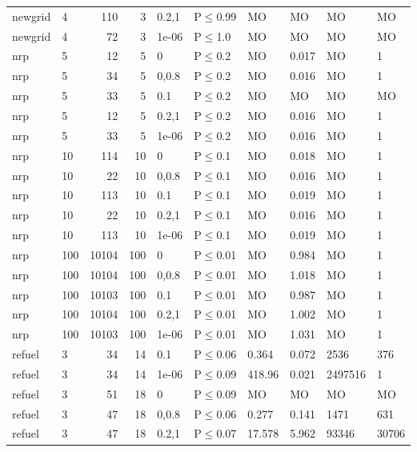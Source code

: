 \begin{longtable}{llrrllllll}
 newgrid       & 4         &    	110 &   3 & 0.2,1 & P$\leq$0.99  & MO       & MO       & MO      & MO     \\
 newgrid       & 4         &     	72 &   3 & 1e-06 & P$\leq$1.0   & MO       & MO       & MO      & MO     \\
 nrp           & 5         &     	12 &   5 & 0     & P$\leq$0.2   & MO       & 0.017    & MO      & 1      \\
 nrp           & 5         &     	34 &   5 & 0,0.8 & P$\leq$0.2   & MO       & 0.016    & MO      & 1      \\
 nrp           & 5         &     	33 &   5 & 0.1   & P$\leq$0.2   & MO       & MO       & MO      & MO     \\
 nrp           & 5         &     	12 &   5 & 0.2,1 & P$\leq$0.2   & MO       & 0.016    & MO      & 1      \\
 nrp           & 5         &     	33 &   5 & 1e-06 & P$\leq$0.2   & MO       & 0.016    & MO      & 1      \\
 nrp           & 10        &    	114 &  10 & 0     & P$\leq$0.1   & MO       & 0.018    & MO      & 1      \\
 nrp           & 10        &     	22 &  10 & 0,0.8 & P$\leq$0.1   & MO       & 0.016    & MO      & 1      \\
 nrp           & 10        &    	113 &  10 & 0.1   & P$\leq$0.1   & MO       & 0.019    & MO      & 1      \\
 nrp           & 10        &     	22 &  10 & 0.2,1 & P$\leq$0.1   & MO       & 0.016    & MO      & 1      \\
 nrp           & 10        &    	113 &  10 & 1e-06 & P$\leq$0.1   & MO       & 0.019    & MO      & 1      \\
 nrp           & 100       &  	10104 & 100 & 0     & P$\leq$0.01  & MO       & 0.984    & MO      & 1      \\
 nrp           & 100       &  	10104 & 100 & 0,0.8 & P$\leq$0.01  & MO       & 1.018    & MO      & 1      \\
 nrp           & 100       &  	10103 & 100 & 0.1   & P$\leq$0.01  & MO       & 0.987    & MO      & 1      \\
 nrp           & 100       &  	10104 & 100 & 0.2,1 & P$\leq$0.01  & MO       & 1.002    & MO      & 1      \\
 nrp           & 100       &  	10103 & 100 & 1e-06 & P$\leq$0.01  & MO       & 1.031    & MO      & 1      \\
 refuel        & 3         &     	34 &  14 & 0.1   & P$\leq$0.06  & 0.364    & 0.072    & 2536    & 376    \\
 refuel        & 3         &     	34 &  14 & 1e-06 & P$\leq$0.09  & 418.96   & 0.021    & 2497516 & 1      \\
 refuel        & 3         &     	51 &  18 & 0     & P$\leq$0.09  & MO       & MO       & MO      & MO     \\
 refuel        & 3         &     	47 &  18 & 0,0.8 & P$\leq$0.06  & 0.277    & 0.141    & 1471    & 631    \\
 refuel        & 3         &     	47 &  18 & 0.2,1 & P$\leq$0.07  & 17.578   & 5.962    & 93346   & 30706  \\
\bottomrule
\end{longtable}
